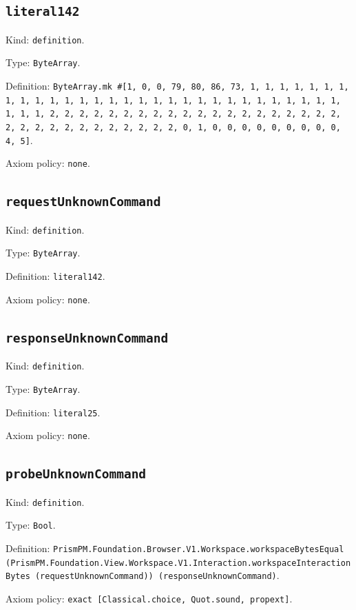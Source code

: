 \documentclass[11pt]{article}
\begin{document}
\subsection*{\texttt{literal142}}
\noindent Kind: \texttt{definition}.\par
\noindent Type: \texttt{ByteArray}.\par
\noindent Definition: \texttt{ByteArray.mk \#[1, 0, 0, 79, 80, 86, 73, 1, 1, 1, 1, 1, 1, 1, 1, 1, 1, 1, 1, 1, 1, 1, 1, 1, 1, 1, 1, 1, 1, 1, 1, 1, 1, 1, 1, 1, 1, 1, 1, 1, 2, 2, 2, 2, 2, 2, 2, 2, 2, 2, 2, 2, 2, 2, 2, 2, 2, 2, 2, 2, 2, 2, 2, 2, 2, 2, 2, 2, 2, 2, 2, 2, 0, 1, 0, 0, 0, 0, 0, 0, 0, 0, 0, 4, 5]}.\par
\noindent Axiom policy: \texttt{none}.\par
\subsection*{\texttt{requestUnknownCommand}}
\noindent Kind: \texttt{definition}.\par
\noindent Type: \texttt{ByteArray}.\par
\noindent Definition: \texttt{literal142}.\par
\noindent Axiom policy: \texttt{none}.\par
\subsection*{\texttt{responseUnknownCommand}}
\noindent Kind: \texttt{definition}.\par
\noindent Type: \texttt{ByteArray}.\par
\noindent Definition: \texttt{literal25}.\par
\noindent Axiom policy: \texttt{none}.\par
\subsection*{\texttt{probeUnknownCommand}}
\noindent Kind: \texttt{definition}.\par
\noindent Type: \texttt{Bool}.\par
\noindent Definition: \texttt{PrismPM.Foundation.Browser.V1.Workspace.workspaceBytesEqual (PrismPM.Foundation.View.Workspace.V1.Interaction.workspaceInteractionBytes (requestUnknownCommand)) (responseUnknownCommand)}.\par
\noindent Axiom policy: \texttt{exact [Classical.choice, Quot.sound, propext]}.\par
\end{document}
